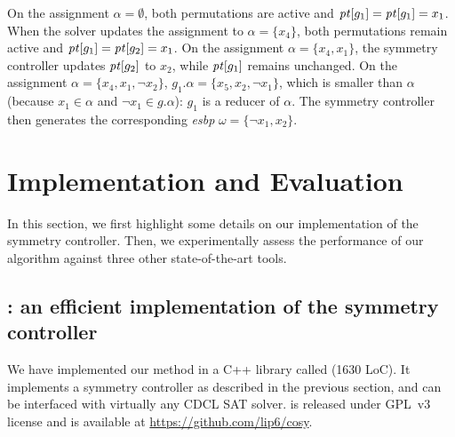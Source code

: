  On the assignment $\alpha = \emptyset$, both permutations are active and
 $\mathit{pt}[g_1] = \mathit{pt}[g_1] = x_1$. When the solver updates the assignment to $\alpha = \{ x_4\}$, both permutations remain active and $\mathit{pt}[g_1] = \mathit{pt}[g_2] = x_1$. On the assignment $\alpha = \{  x_4,  x_1\}$, the symmetry controller updates $\mathit{pt}[g_2]$ to $x_2$, while $\mathit{pt}[g_1]$ remains unchanged. On the assignment $\alpha = \{  x_4,  x_1, \neg x_2 \}$, $g_1.\alpha = \{  x_5,  x_2, \neg x_1
 \}$, which is smaller than $\alpha$ (because $ x_1 \in \alpha$ and $ \neg x_1 \in g.\alpha$):
 $g_1$ is a reducer of $\alpha$. The symmetry controller then generates the
 corresponding \textit{esbp} $\omega = \{ \neg x_1, x_2 \}$.
 
 
\section{Implementation and Evaluation}\label{sec:eval}
In this section, we first highlight some details on our implementation of the
symmetry controller. Then, we experimentally assess the performance of our
algorithm against three other state-of-the-art tools.
\subsection{\libdsb{}: an efficient implementation of the symmetry controller}
We have implemented our method in a C++ library called \libdsb{} (1630 LoC). It
implements a symmetry controller as described in the previous section, and can
be interfaced with virtually any CDCL SAT solver. \libdsb{} is released under
GPL~v3 license and is available at \url{https://github.com/lip6/cosy}.

